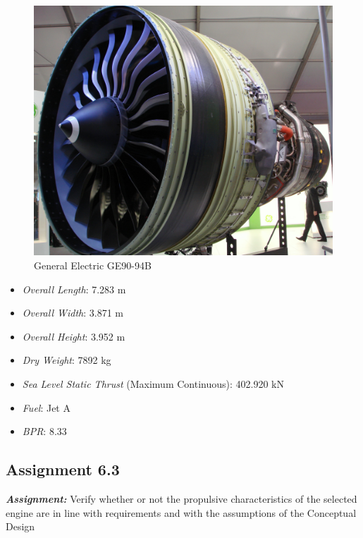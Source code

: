 \documentclass{article}
\begin{document}
\begin{figure}[h!]
    \centering
    \includegraphics[width=\textwidth]{Sources/Plots_and_Pictures/engine.jpeg}
    \caption{General Electric GE90-94B \autocite{ge90}}
    \label{General_electric}
\end{figure}

\begin{itemize}
    \item \textit{Overall Length}: 7.283 m
    \item \textit{Overall Width}: 3.871 m
    \item \textit{Overall Height}: 3.952 m
    \item \textit{Dry Weight}: 7892 kg
    \item \textit{Sea Level Static Thrust} (Maximum Continuous): 402.920 kN
    \item \textit{Fuel}: Jet A
    \item \textit{BPR}: 8.33
\end{itemize}

\clearpage



\subsection{Assignment 6.3\label{Assignment_6.3}}

\textbf{\textit{Assignment:}} Verify whether or not the propulsive characteristics of the selected 
engine are in line with requirements and with the assumptions of the Conceptual Design \\ \\ \\ 
\end{document}
